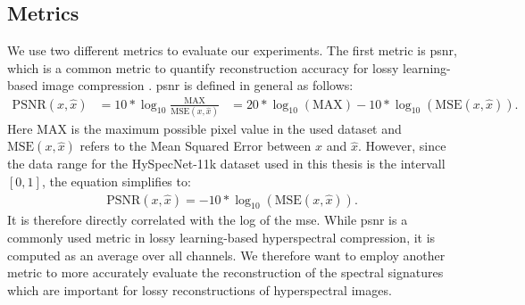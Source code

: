 \subsection{Metrics}
We use two different metrics to evaluate our experiments. The first metric is \ac{psnr}, which is a common metric to quantify reconstruction accuracy for lossy learning-based image compression \citep{balle_end--end_2017,balle_variational_2018,minnen_joint_2018,kuester_1d-convolutional_2021,kuester_transferability_2022,la_grassa_hyperspectral_2022}. \Ac{psnr}  is defined in general as follows:
\begin{align}
\text{PSNR}(x,\hat{x}) &= 10*\log_{10}\frac{\text{MAX}}{\text{MSE}(x,\hat{x})}
&= 20 * \log_{10}(\text{MAX}) - 10*\log_{10}(\text{MSE}(x,\hat{x})).
\end{align}
Here MAX is the maximum possible pixel value in the used dataset and $\text{MSE}(x,\hat{x})$ refers to the Mean Squared Error between $x$ and $\hat{x}$. However, since the data range for the HySpecNet-11k dataset used in this thesis is the intervall $[0,1]$, the equation simplifies to:
\begin{align}
\text{PSNR}(x,\hat{x}) = - 10*\log_{10}(\text{MSE}(x,\hat{x})).
\end{align}
It is therefore directly correlated with the log of the \ac{mse}.
While \ac{psnr} is a commonly used metric in lossy learning-based hyperspectral compression, it is computed as an average over all channels. We therefore want to employ another metric to more accurately evaluate the reconstruction of the spectral signatures which are important for lossy reconstructions of hyperspectral images.

